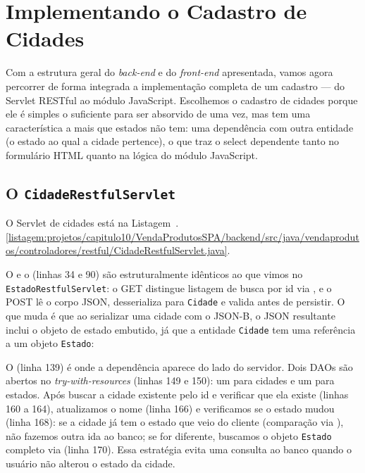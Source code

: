 \section{Implementando o Cadastro de Cidades}

Com a estrutura geral do \textit{back-end} e do \textit{front-end} apresentada, vamos agora percorrer de forma integrada a implementação completa de um cadastro --- do Servlet RESTful ao módulo JavaScript. Escolhemos o cadastro de cidades porque ele é simples o suficiente para ser absorvido de uma vez, mas tem uma característica a mais que estados não tem: uma dependência com outra entidade (o estado ao qual a cidade pertence), o que traz o select dependente tanto no formulário HTML quanto na lógica do módulo JavaScript.


\subsection{O \texttt{CidadeRestfulServlet}}

O Servlet de cidades está na Listagem~\thechapter.\ref{listagem:projetos/capitulo10/VendaProdutosSPA/backend/src/java/vendaprodutos/controladores/restful/CidadeRestfulServlet.java}.


O  e o  (linhas 34 e 90) são estruturalmente idênticos ao que vimos no \texttt{EstadoRestfulServlet}: o GET distingue listagem de busca por id via , e o POST lê o corpo JSON, desserializa para \texttt{Cidade} e valida antes de persistir. O que muda é que ao serializar uma cidade com o JSON-B, o JSON resultante inclui o objeto de estado embutido, já que a entidade \texttt{Cidade} tem uma referência a um objeto \texttt{Estado}:

\begin{boxJsonCode}
\end{boxJsonCode}

O  (linha 139) é onde a dependência aparece do lado do servidor. Dois DAOs são abertos no \textit{try-with-resources} (linhas 149 e 150): um para cidades e um para estados. Após buscar a cidade existente pelo id e verificar que ela existe (linhas 160 a 164), atualizamos o nome (linha 166) e verificamos se o estado mudou (linha 168): se a cidade já tem o estado que veio do cliente (comparação via ), não fazemos outra ida ao banco; se for diferente, buscamos o objeto \texttt{Estado} completo via  (linha 170). Essa estratégia evita uma consulta ao banco quando o usuário não alterou o estado da cidade.

